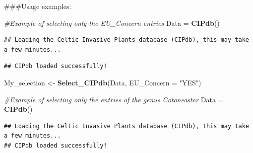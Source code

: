 \documentclass[
]{article}
\newenvironment{Shaded}{\begin{snugshade}}{\end{snugshade}}
\newcommand{\AttributeTok}[1]{\textcolor[rgb]{0.13,0.29,0.53}{#1}}
\newcommand{\CommentTok}[1]{\textcolor[rgb]{0.56,0.35,0.01}{\textit{#1}}}
\newcommand{\FunctionTok}[1]{\textcolor[rgb]{0.13,0.29,0.53}{\textbf{#1}}}
\newcommand{\NormalTok}[1]{#1}
\newcommand{\OtherTok}[1]{\textcolor[rgb]{0.56,0.35,0.01}{#1}}
\newcommand{\StringTok}[1]{\textcolor[rgb]{0.31,0.60,0.02}{#1}}
\begin{document}
\#\#\#Usage examples:

\begin{Shaded}
\begin{Highlighting}[]
\CommentTok{\#Example of selecting only the EU\_Concern entries}
\NormalTok{Data }\OtherTok{=} \FunctionTok{CIPdb}\NormalTok{()}
\end{Highlighting}
\end{Shaded}

\begin{verbatim}
## Loading the Celtic Invasive Plants database (CIPdb), this may take a few minutes...
\end{verbatim}

\begin{verbatim}
## CIPdb loaded successfully!
\end{verbatim}

\begin{Shaded}
\begin{Highlighting}[]
\NormalTok{My\_selection }\OtherTok{\textless{}{-}} \FunctionTok{Select\_CIPdb}\NormalTok{(Data, }\AttributeTok{EU\_Concern =} \StringTok{"YES"}\NormalTok{)}

\CommentTok{\#Example of selecting only the entries of the genus Cotoneaster}
\NormalTok{Data }\OtherTok{=} \FunctionTok{CIPdb}\NormalTok{()}
\end{Highlighting}
\end{Shaded}

\begin{verbatim}
## Loading the Celtic Invasive Plants database (CIPdb), this may take a few minutes...
## CIPdb loaded successfully!
\end{verbatim}
\end{document}
